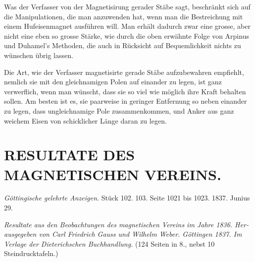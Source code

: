 \documentclass[fontsize=10pt,paper=a5,pagesize=auto]{scrbook}
\newcommand{\origpage}[1]{\marginpar{\footnotesize\textit{S. #1}}}
\begin{document}
\origpage{595}
Was der Verfasser von der Magnetisirung gerader Stäbe sagt, beschränkt sich auf die Manipulationen, die man anzuwenden hat, wenn man die Bestreichung mit einem Hufeisenmagnet ausführen will. Man erhält dadurch zwar eine grosse, aber nicht eine eben so grosse Stärke, wie durch die oben erwähnte Folge von Arpinus und Duhamel's Methoden, die auch in Rücksicht auf Bequemlichkeit nichts zu wünschen übrig lassen.

Die Art, wie der Verfasser magnetisirte gerade Stäbe aufzubewahren empfiehlt, nemlich sie mit den gleichnamigen Polen auf einander zu legen, ist ganz verwerflich, wenn man wünscht, dass sie so viel wie möglich ihre Kraft behalten sollen. Am besten ist es, sie paarweise in geringer Entfernung so neben einander zu legen, dass ungleichnamige Pole zusammenkommen, und Anker aus ganz weichem Eisen von schicklicher Länge daran zu legen.


\section*{RESULTATE DES MAGNETISCHEN VEREINS.}
\label{sec:magnetischer-verein}

\origpage{595}
\begin{otherlanguage}{ngerman}
\textit{Göttingische gelehrte Anzeigen.} Stück 102. 103. Seite 1021 bis 1023. 1837. Junius 29.

\medskip

\textit{Resultate aus den Beobachtungen des magnetischen Vereins im Jahre 1836. Herausgegeben von Carl Friedrich Gauss und Wilhelm Weber. Göttingen 1837. Im Verlage der Dieterichschen Buchhandlung.} (124 Seiten in 8., nebst 10 Steindrucktafeln.)
\end{otherlanguage}
\end{document}

